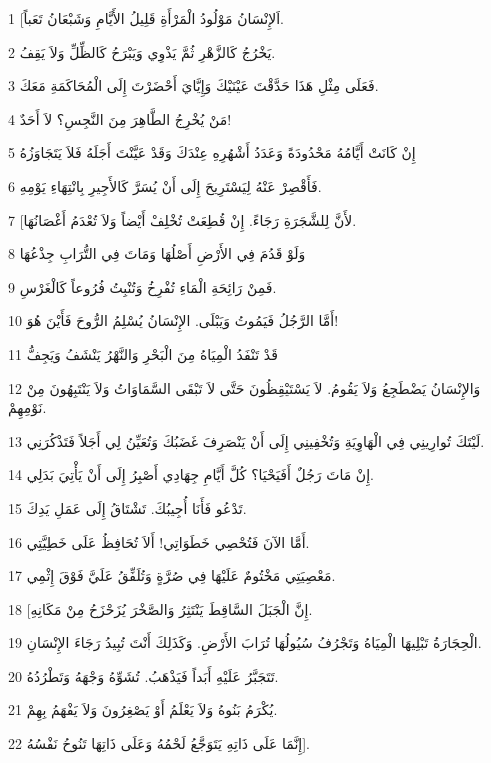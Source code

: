 \par 1 [اَلإِنْسَانُ مَوْلُودُ الْمَرْأَةِ قَلِيلُ الأَيَّامِ وَشَبْعَانُ تَعَباً.
\par 2 يَخْرُجُ كَالزَّهْرِ ثُمَّ يَذْوِي وَيَبْرَحُ كَالظِّلِّ وَلاَ يَقِفُ.
\par 3 فَعَلَى مِثْلِ هَذَا حَدَّقْتَ عَيْنَيْكَ وَإِيَّايَ أَحْضَرْتَ إِلَى الْمُحَاكَمَةِ مَعَكَ.
\par 4 مَنْ يُخْرِجُ الطَّاهِرَ مِنَ النَّجِسِ؟ لاَ أَحَدٌ!
\par 5 إِنْ كَانَتْ أَيَّامُهُ مَحْدُودَةً وَعَدَدُ أَشْهُرِهِ عِنْدَكَ وَقَدْ عَيَّنْتَ أَجَلَهُ فَلاَ يَتَجَاوَزُهُ
\par 6 فَأَقْصِرْ عَنْهُ لِيَسْتَرِيحَ إِلَى أَنْ يُسَرَّ كَالأَجِيرِ بِانْتِهَاءِ يَوْمِهِ.
\par 7 [لأَنَّ لِلشَّجَرَةِ رَجَاءً. إِنْ قُطِعَتْ تُخْلِفْ أَيْضاً وَلاَ تُعْدَمُ أَغْصَانُهَا.
\par 8 وَلَوْ قَدُمَ فِي الأَرْضِ أَصْلُهَا وَمَاتَ فِي التُّرَابِ جِذْعُهَا
\par 9 فَمِنْ رَائِحَةِ الْمَاءِ تُفْرِخُ وَتُنْبِتُ فُرُوعاً كَالْغَرْسِ.
\par 10 أَمَّا الرَّجُلُ فَيَمُوتُ وَيَبْلَى. الإِنْسَانُ يُسْلِمُ الرُّوحَ فَأَيْنَ هُوَ!
\par 11 قَدْ تَنْفَدُ الْمِيَاهُ مِنَ الْبَحْرِ وَالنَّهْرُ يَنْشَفُ وَيَجِفُّ
\par 12 وَالإِنْسَانُ يَضْطَجِعُ وَلاَ يَقُومُ. لاَ يَسْتَيْقِظُونَ حَتَّى لاَ تَبْقَى السَّمَاوَاتُ وَلاَ يَنْتَبِهُونَ مِنْ نَوْمِهِمْ.
\par 13 لَيْتَكَ تُوارِينِي فِي الْهَاوِيَةِ وَتُخْفِينِي إِلَى أَنْ يَنْصَرِفَ غَضَبُكَ وَتُعَيِّنُ لِي أَجَلاً فَتَذْكُرَنِي.
\par 14 إِنْ مَاتَ رَجُلٌ أَفَيَحْيَا؟ كُلَّ أَيَّامِ جِهَادِي أَصْبِرُ إِلَى أَنْ يَأْتِيَ بَدَلِي.
\par 15 تَدْعُو فَأَنَا أُجِيبُكَ. تَشْتَاقُ إِلَى عَمَلِ يَدِكَ.
\par 16 أَمَّا الآنَ فَتُحْصِي خَطَوَاتِي! أَلاَ تُحَافِظُ عَلَى خَطِيَّتِي.
\par 17 مَعْصِيَتِي مَخْتُومٌ عَلَيْهَا فِي صُرَّةٍ وَتُلَفِّقُ عَلَيَّ فَوْقَ إِثْمِي.
\par 18 [إِنَّ الْجَبَلَ السَّاقِطَ يَنْتَثِرُ وَالصَّخْرَ يُزَحْزَحُ مِنْ مَكَانِهِ.
\par 19 الْحِجَارَةُ تَبْلِيهَا الْمِيَاهُ وَتَجْرُفُ سُيُولُهَا تُرَابَ الأَرْضِ. وَكَذَلِكَ أَنْتَ تُبِيدُ رَجَاءَ الإِنْسَانِ.
\par 20 تَتَجَبَّرُ عَلَيْهِ أَبَداً فَيَذْهَبُ. تُشَوِّهُ وَجْهَهُ وَتَطْرُدُهُ.
\par 21 يُكْرَمُ بَنُوهُ وَلاَ يَعْلَمُ أَوْ يَصْغِرُونَ وَلاَ يَفْهَمُ بِهِمْ.
\par 22 إِنَّمَا عَلَى ذَاتِهِ يَتَوَجَّعُ لَحْمُهُ وَعَلَى ذَاتِهَا تَنُوحُ نَفْسُهُ].

